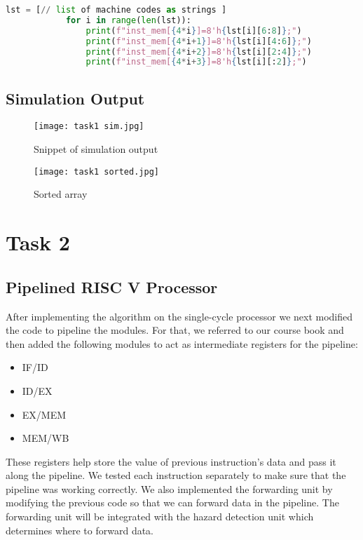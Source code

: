 \documentclass[12pt]{article}
\begin{document}
        \begin{lstlisting}[language=Python, caption={python script to initialize instruction memory}, label=lst:example]
        lst = [// list of machine codes as strings ]
            for i in range(len(lst)):
                print(f"inst_mem[{4*i}]=8'h{lst[i][6:8]};")
                print(f"inst_mem[{4*i+1}]=8'h{lst[i][4:6]};")
                print(f"inst_mem[{4*i+2}]=8'h{lst[i][2:4]};")
                print(f"inst_mem[{4*i+3}]=8'h{lst[i][:2]};")
        \end{lstlisting}

\subsection{Simulation Output}\label{code1}
    \begin{figure}[htbp!]
        \centering
        \texttt{[image: task1 sim.jpg]}
        \caption{Snippet of simulation output}
    \end{figure}
   
    \begin{figure}[htbp!]
    \begin{center}
            
            \texttt{[image: task1 sorted.jpg]}
            \caption{Sorted array}
    \end{center}
    \end{figure}

\section{Task 2}\label{task2}
    \subsection{Pipelined RISC V Processor}\label{task2intro}
    After implementing the algorithm on the single-cycle processor we next modified the code to pipeline the modules. For that, we referred to our course book and then added the following modules to act as intermediate registers for the pipeline:
    \begin{itemize}
        \item IF/ID
        \item ID/EX
        \item EX/MEM
        \item MEM/WB
    \end{itemize}
    These registers help store the value of previous instruction's data and pass it along the pipeline. We tested each instruction separately to make sure that the pipeline was working correctly. We also implemented the forwarding unit by modifying the previous code so that we can forward data in the pipeline. The forwarding unit will be integrated with the hazard detection unit which determines where to forward data.
\newpage
\end{document}
